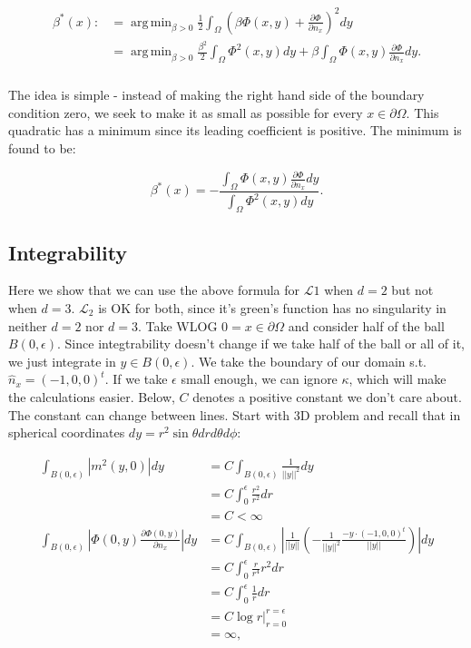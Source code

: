 \documentclass[paper=a4, fontsize=11pt]{scrartcl} %
\DeclareMathOperator*{\argmin}{arg\,min}
\numberwithin{equation}{section} %
\numberwithin{figure}{section} %
\numberwithin{table}{section} %
\newcommand{\Op}{\mathcal{L}}
\begin{document}
\begin{align}
  \begin{split}
    \beta^{*}(x) :&= \argmin_{\beta > 0} \frac{1}{2} \int_{\Omega} (\beta \Phi(x,y) + \frac{\partial \Phi}{\partial n_{x}} )^{2} dy \\
    &= \argmin_{\beta > 0} \frac{\beta^2}{2} \int_{\Omega} \Phi^2(x,y) dy+\beta \int_{\Omega} \Phi(x,y) \frac{\partial \Phi}{\partial n_{x}} dy. \\
  \end{split}
\end{align}

The idea is simple - instead of making the right hand side of the boundary condition zero, we seek to make it as small as possible for 
every $x\in \partial \Omega$. This quadratic has a minimum since its leading coefficient 
is positive. The minimum is found to be:

$$
\beta^{*}(x) = - \frac{\int_{\Omega}  \Phi(x,y) \frac{\partial \Phi}{\partial n_{x}} dy}{\int_{\Omega}  \Phi^2(x,y) dy}.
$$



\subsection{Integrability}\label{integrability}
Here we show that we can use the above formula for $\Op{1}$ when $d=2$ but not when $d=3$.
$\Op_{2}$ is OK for both, since it's green's function has no singularity in neither $d=2$ nor $d=3$.
Take WLOG $0=x\in \partial \Omega$ and consider half of the ball $B(0,\epsilon)$.
Since integtrability doesn't change if we take half of the ball or all of it, we just integrate in $y\in B(0,\epsilon)$. We take the boundary
of our domain s.t.  $\hat{n}_x = (-1,0,0)^t$.  If we take $\epsilon$ small enough, we can ignore $\kappa$, which will make the calculations
easier. Below, $C$ denotes a positive constant we don't care about. The constant can change between lines. 
Start with 3D problem and recall that in spherical coordinates $dy = r^2 \sin \theta dr d\theta d \phi$:

\begin{align*}
    \int_{B(0,\epsilon)} |m^2(y,0)|dy &= C\int_{B(0,\epsilon)} \frac{1}{||y||^2} dy \\
    &= C \int_{0}^{\epsilon} \frac{r^2}{r^2} dr \\
    &= C < \infty \\
    \int_{B(0,\epsilon)} |\Phi(0,y) \frac{\partial \Phi(0,y)}{\partial n_x}| dy &= C\int_{B(0,\epsilon)} |\frac{1}{||y||} (-\frac{1}{||y||^2} \frac{-y\cdot (-1,0,0)^t}{||y||})| dy\\
    &= C \int_{0}^{\epsilon} \frac{r }{r^4}r^2  dr  \\
    &= C \int_{0}^{\epsilon} \frac{1}{r} dr \\
    &= C \log r|_{r=0}^{r=\epsilon} \\
    & = \infty,
\end{align*}
\end{document}
